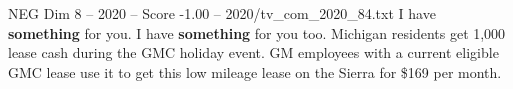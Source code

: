 \begin{textsample}{NEG Dim 8 – 2020 – Score -1.00 – 2020/tv\_com\_2020\_84.txt}  \label{ex:f8_neg_078}
I have \textbf{something} for you.
I have \textbf{something} for you too.
Michigan residents get 1,000 lease cash during the GMC holiday event.
GM employees with a current eligible GMC lease use it to get this low mileage lease on the Sierra for \$169 per month.

\end{textsample}
